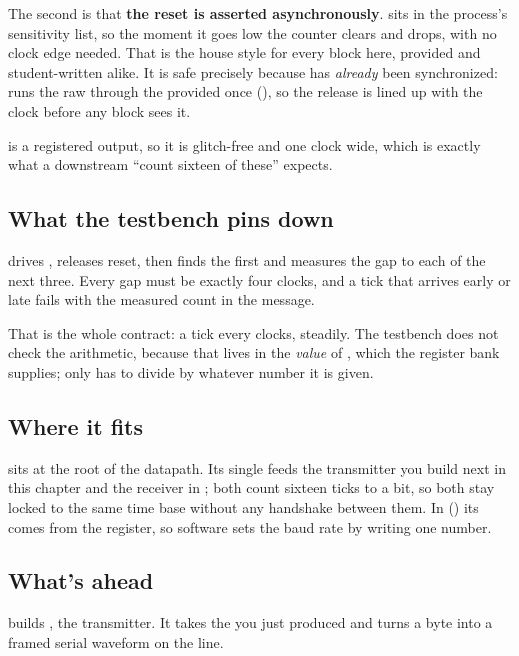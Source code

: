 The second is that \textbf{the reset is asserted asynchronously}.  sits in the
process's sensitivity list, so the moment it goes low the counter clears and  drops, with
no clock edge needed. That is the house style for every block here, provided and student-written
alike. It is safe precisely because  has \emph{already} been synchronized:
 runs the raw  through the provided  once
(), so the release is lined up with the clock before any block sees it.

 is a registered output, so it is glitch-free and one clock wide, which is exactly what a
downstream ``count sixteen of these'' expects.

\subsection{What the testbench pins down}
\label{c2:sec:baud_gen_tb}
 drives , releases reset, then finds the first  and
measures the gap to each of the next three. Every gap must be exactly four clocks, and a tick that
arrives early or late fails with the measured count in the message.

That is the whole contract: a tick every  clocks, steadily. The testbench does not check
the  arithmetic, because that lives in the \emph{value} of , which the
register bank supplies;  only has to divide by whatever number it is given.

\subsection{Where it fits}
\label{c2:sec:baud_gen_fits}
 sits at the root of the datapath. Its single  feeds the transmitter you
build next in this chapter and the receiver in ; both count sixteen ticks to a bit, so
both stay locked to the same time base without any handshake between them. In 
() its  comes from the  register, so software sets the baud rate
by writing one number.

\subsection{What's ahead}
 builds , the transmitter. It takes the  you just
produced and turns a byte into a framed serial waveform on the  line.
